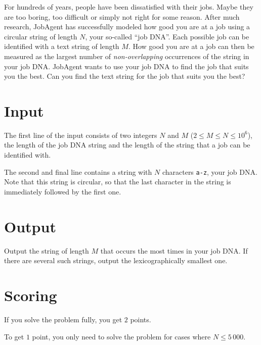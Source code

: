 For hundreds of years, people have been dissatisfied with their jobs.
Maybe they are too boring, too difficult or simply not right for some reason.
After much research, JobAgent has successfully modeled how good you are at a job using a circular string of length $N$, your so-called ``job DNA''.
Each possible job can be identified with a text string of length $M$.
How good you are at a job can then be measured as the largest number of \emph{non-overlapping} occurrences of the string in your job DNA.
JobAgent wants to use your job DNA to find the job that suits you the best.
Can you find the text string for the job that suits you the best?

\section*{Input}
The first line of the input consists of two integers $N$ and $M$ ($2 \le M \le N \le 10^6$), the length of the job DNA string and the length of the string that a job can be identified with.

The second and final line contains a string with $N$ characters \texttt{a-z}, your job DNA.
Note that this string is circular, so that the last character in the string is immediately followed by the first one.

\section*{Output}
Output the string of length $M$ that occurs the most times in your job DNA.
If there are several such strings, output the lexicographically smallest one.

\section*{Scoring}
If you solve the problem fully, you get $2$ points.

To get $1$ point, you only need to solve the problem for cases where $N \le 5\,000$.

